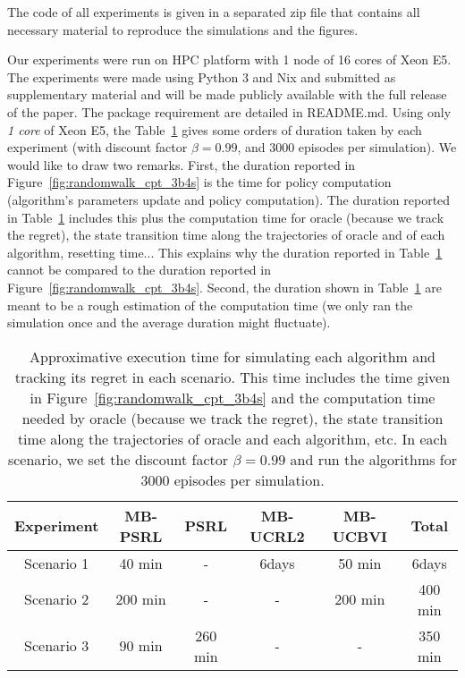 The code of all experiments is given in a separated zip file that contains all necessary material to reproduce the simulations and the figures. 

Our experiments were run on HPC platform with 1 node of 16 cores of Xeon E5. The experiments were made using Python 3 and Nix and submitted as supplementary material and will be made publicly available with the full release of the paper. The package requirement are detailed in README.md. Using only \emph{1 core} of Xeon E5, the Table~\ref{tab:sim_time} gives some orders of duration taken by each experiment (with discount factor $\beta=0.99$, and 3000 episodes per simulation). We would like to draw two remarks. First, the duration reported in Figure~\ref{fig:randomwalk_cpt_3b4s} is the time for policy computation (algorithm's parameters update and policy computation). The duration reported in Table~\ref{tab:sim_time} includes this plus the computation time for oracle (because we track the regret), the state transition time along the trajectories of oracle and of each algorithm, resetting time... This explains why the duration reported in Table~\ref{tab:sim_time} cannot be compared to the duration reported in Figure~\ref{fig:randomwalk_cpt_3b4s}.  Second, the duration shown in Table~\ref{tab:sim_time} are meant to be a rough estimation of the computation time (we only ran the simulation once and the average duration might fluctuate). 

\begin{table}[ht]
    \centering
    \begin{tabular}{ |c|c|c|c|c|c| } 
    \hline
    Experiment & MB-PSRL  & PSRL & MB-UCRL2 & MB-UCBVI & Total\\
    \hline
    Scenario 1 & 40 min  & - & 6days & 50 min & 6days\\ 
    \hline
    Scenario 2 & 200 min  & - & - & 200 min & 400 min\\ 
    \hline
    Scenario 3 & 90 min  & 260 min & - & - & 350 min\\ 
    \hline
    \end{tabular}
\vspace{0.2cm}
\caption{Approximative execution time for simulating each algorithm and tracking its regret in each scenario. This time includes the time given in Figure~\ref{fig:randomwalk_cpt_3b4s} and the computation time needed by oracle (because we track the regret), the state transition time along the trajectories of oracle and each algorithm, etc. In each scenario, we set the discount factor $\beta=0.99$ and run the algorithms for $3000$ episodes per simulation.}
\label{tab:sim_time}
\end{table}

\endgroup



